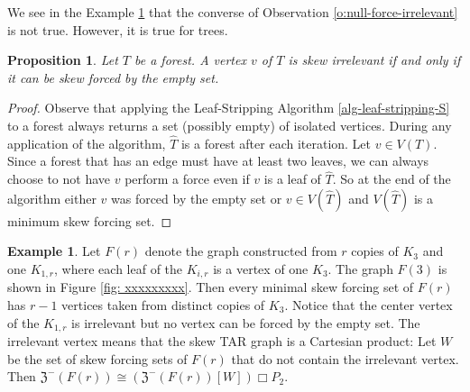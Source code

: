 \documentclass{article}
\numberwithin{figure}{section}
\numberwithin{table}{section}
\numberwithin{equation}{section}
\newtheorem{prop}[thm]{Proposition}
\theoremstyle{definition}
\theoremstyle{definition}
\theoremstyle{definition}
\newtheorem{ex}[thm]{Example}
\newcommand{\bpf}{\begin{proof}}
\newcommand{\epf}{\end{proof}\ms}
\newcommand{\ms}{\medskip}
\newcommand{\lp}{\left(}
\newcommand{\rp}{\right)}
\newcommand{\zstar}{\mathfrak{Z}^-}%
\begin{document}
{We  see in the Example \ref{o:not-null-force-irrelevant} 
that the converse of Observation \ref{o:null-force-irrelevant} is not true.   However, it is true for trees. %



\begin{prop}\label{p:tree-skew}
    Let $T$ be a forest.  A vertex $v$ of $T$ is skew irrelevant if and only if it can be skew forced by the empty set.
\end{prop}
\bpf Observe that applying the Leaf-Stripping Algorithm \ref{alg-leaf-stripping-S} to a forest always returns a set (possibly empty) of isolated vertices.  During any application of the algorithm, $\hat T$ is a forest after each iteration. Let $v\in V(T)$. Since a forest that has an edge must have at least two leaves, we can always choose to  not have $v$ perform a force even if $v$ is a leaf of $\hat T$.  So at the end of the algorithm either $v$ was forced by the empty set or $v\in V(\hat T)$ and $V(\hat T)$ is a minimum skew forcing set.
\epf



\begin{ex}\label{o:not-null-force-irrelevant}
    Let $F(r)$ denote the graph constructed from $r$ copies of $K_3$ and one $K_{1,r}$, where each leaf of the $K_{i,r}$ is a vertex of one $K_3$. The graph $F(3)$ is shown in Figure \ref{fig: xxxxxxxxx}. Then every minimal skew forcing set of $F(r)$ has $r-1$ vertices taken from distinct copies of $K_3$.  Notice that the center vertex of the $K_{1,r}$ is irrelevant but no vertex can be forced by the empty set. The irrelevant vertex means that the skew TAR graph is a Cartesian product: Let $W$ be the set of  skew forcing sets of $F(r)$ that do not contain the irrelevant vertex.  Then
    $\zstar(F(r))\cong \lp \zstar(F(r))[W]\rp\Box P_2$.  %
\end{ex}



\begin{figure}[!h]
\centering
{}
\end{figure}}
\end{document}
